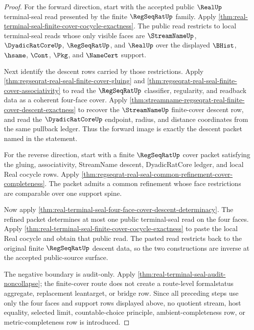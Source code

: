 \begin{proof}
For the forward direction, start with the accepted public $\RealUp$
terminal-seal read presented by the finite $\RegSeqRatUp$ family. Apply
\autoref{thm:real-terminal-seal-finite-cover-cocycle-exactness}. The public
read restricts to local terminal-seal reads whose only visible faces are
$\StreamNameUp$, $\DyadicRatCoreUp$, $\RegSeqRatUp$, and $\RealUp$ over the
displayed $\BHist$, $\hsame$, $\Cont$, $\Pkg$, and $\NameCert$ support.

Next identify the descent rows carried by those restrictions. Apply
\autoref{thm:regseqrat-real-seal-finite-cover-gluing} and
\autoref{thm:regseqrat-real-seal-finite-cover-associativity} to read the
$\RegSeqRatUp$ classifier, regularity, and readback data as a coherent
four-face cover. Apply
\autoref{thm:streamname-regseqrat-real-finite-cover-descent-exactness} to
recover the $\StreamNameUp$ finite-cover descent row, and read the
$\DyadicRatCoreUp$ endpoint, radius, and distance coordinates from the same
pullback ledger. Thus the forward image is exactly the descent packet named in
the statement.

For the reverse direction, start with a finite $\RegSeqRatUp$ cover packet
satisfying the gluing, associativity, StreamName descent, DyadicRatCore ledger,
and local Real cocycle rows. Apply
\autoref{thm:regseqrat-real-seal-common-refinement-cover-completeness}. The
packet admits a common refinement whose face restrictions are comparable over
one support spine.

Now apply
\autoref{thm:real-terminal-seal-four-face-cover-descent-determinacy}. The
refined packet determines at most one public terminal-seal read on the four
faces. Apply
\autoref{thm:real-terminal-seal-finite-cover-cocycle-exactness} to paste the
local Real cocycle and obtain that public read. The pasted read restricts back
to the original finite $\RegSeqRatUp$ descent data, so the two constructions
are inverse at the accepted public-source surface.

The negative boundary is audit-only. Apply
\autoref{thm:real-terminal-seal-audit-noncollapse}; the finite-cover route
does not create a route-level formalstatus aggregate, replacement leantarget,
or bridge row. Since all preceding steps use only the four faces and support
rows displayed above, no quotient stream, host equality, selected limit,
countable-choice principle, ambient-completeness row, or metric-completeness
row is introduced.
\end{proof}

